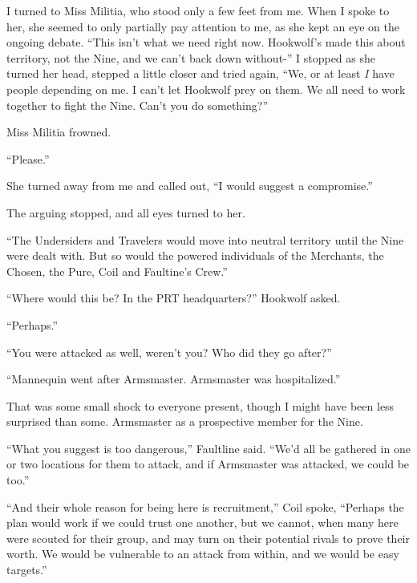 I turned to Miss Militia, who stood only a few feet from me.  When I spoke to her, she seemed to only partially pay attention to me, as she kept an eye on the ongoing debate.  ``This isn't what we need right now.  Hookwolf's made this about territory, not the Nine, and we can't back down without-''  I stopped as she turned her head, stepped a little closer and tried again, ``We, or at least \emph{I} have people depending on me.  I can't let Hookwolf prey on them.  We all need to work together to fight the Nine.  Can't you do something?''



Miss Militia frowned.



``Please.''



She turned away from me and called out, ``I would suggest a compromise.''



The arguing stopped, and all eyes turned to her.



``The Undersiders and Travelers would move into neutral territory until the Nine were dealt with.  But so would the powered individuals of the Merchants, the Chosen, the Pure, Coil and Faultine's Crew.''



``Where would this be?  In the PRT headquarters?'' Hookwolf asked.



``Perhaps.''



``You were attacked as well, weren't you?  Who did they go after?''



``Mannequin went after Armsmaster.  Armsmaster was hospitalized.''



That was some small shock to everyone present, though I might have been less surprised than some.  Armsmaster as a prospective member for the Nine.



``What you suggest is too dangerous,'' Faultline said.  ``We'd all be gathered in one or two locations for them to attack, and if Armsmaster was attacked, we could be too.''



``And their whole reason for being here is recruitment,'' Coil spoke, ``Perhaps the plan would work if we could trust one another, but we cannot, when many here were scouted for their group, and may turn on their potential rivals to prove their worth.  We would be vulnerable to an attack from within, and we would be easy targets.''



